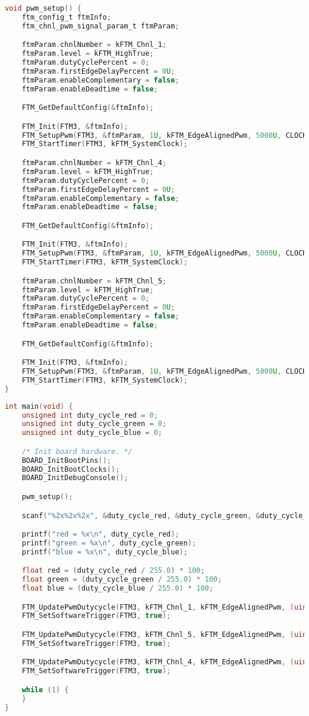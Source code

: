 \begin{lstlisting}[language=c,caption=Problem 5 FTM/PWM Setup, label=list:p5_ftm]
void pwm_setup() {
	ftm_config_t ftmInfo;
	ftm_chnl_pwm_signal_param_t ftmParam;

	ftmParam.chnlNumber = kFTM_Chnl_1;
	ftmParam.level = kFTM_HighTrue;
	ftmParam.dutyCyclePercent = 0;
	ftmParam.firstEdgeDelayPercent = 0U;
	ftmParam.enableComplementary = false;
	ftmParam.enableDeadtime = false;

	FTM_GetDefaultConfig(&ftmInfo);

	FTM_Init(FTM3, &ftmInfo);
	FTM_SetupPwm(FTM3, &ftmParam, 1U, kFTM_EdgeAlignedPwm, 5000U, CLOCK_GetFreq(kCLOCK_BusClk));
	FTM_StartTimer(FTM3, kFTM_SystemClock);

	ftmParam.chnlNumber = kFTM_Chnl_4;
	ftmParam.level = kFTM_HighTrue;
	ftmParam.dutyCyclePercent = 0;
	ftmParam.firstEdgeDelayPercent = 0U;
	ftmParam.enableComplementary = false;
	ftmParam.enableDeadtime = false;

	FTM_GetDefaultConfig(&ftmInfo);

	FTM_Init(FTM3, &ftmInfo);
	FTM_SetupPwm(FTM3, &ftmParam, 1U, kFTM_EdgeAlignedPwm, 5000U, CLOCK_GetFreq(kCLOCK_BusClk));
	FTM_StartTimer(FTM3, kFTM_SystemClock);

	ftmParam.chnlNumber = kFTM_Chnl_5;
	ftmParam.level = kFTM_HighTrue;
	ftmParam.dutyCyclePercent = 0;
	ftmParam.firstEdgeDelayPercent = 0U;
	ftmParam.enableComplementary = false;
	ftmParam.enableDeadtime = false;

	FTM_GetDefaultConfig(&ftmInfo);

	FTM_Init(FTM3, &ftmInfo);
	FTM_SetupPwm(FTM3, &ftmParam, 1U, kFTM_EdgeAlignedPwm, 5000U, CLOCK_GetFreq(kCLOCK_BusClk));
	FTM_StartTimer(FTM3, kFTM_SystemClock);
}
\end{lstlisting}

\begin{lstlisting}[language=c,caption=Problem 5 main, label=list:p5_main]
int main(void) {
	unsigned int duty_cycle_red = 0;
	unsigned int duty_cycle_green = 0;
	unsigned int duty_cycle_blue = 0;

	/* Init board hardware. */
	BOARD_InitBootPins();
	BOARD_InitBootClocks();
	BOARD_InitDebugConsole();

	pwm_setup();

	scanf("%2x%2x%2x", &duty_cycle_red, &duty_cycle_green, &duty_cycle_blue);

	printf("red = %x\n", duty_cycle_red);
	printf("green = %x\n", duty_cycle_green);
	printf("blue = %x\n", duty_cycle_blue);

	float red = (duty_cycle_red / 255.0) * 100;
	float green = (duty_cycle_green / 255.0) * 100;
	float blue = (duty_cycle_blue / 255.0) * 100;

	FTM_UpdatePwmDutycycle(FTM3, kFTM_Chnl_1, kFTM_EdgeAlignedPwm, (uint8_t)red);
	FTM_SetSoftwareTrigger(FTM3, true);

	FTM_UpdatePwmDutycycle(FTM3, kFTM_Chnl_5, kFTM_EdgeAlignedPwm, (uint8_t)green);
	FTM_SetSoftwareTrigger(FTM3, true);

	FTM_UpdatePwmDutycycle(FTM3, kFTM_Chnl_4, kFTM_EdgeAlignedPwm, (uint8_t)blue);
	FTM_SetSoftwareTrigger(FTM3, true);

	while (1) {
	}
}
\end{lstlisting}